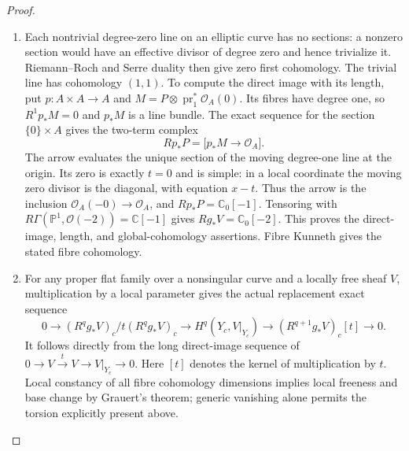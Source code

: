 \begin{proof}

\begin{enumerate}[label={$\langle1\rangle$\arabic*.},leftmargin=*]
\item Each nontrivial degree-zero line on an elliptic curve has no
sections: a nonzero section would have an effective divisor of
degree zero and hence trivialize it. Riemann--Roch and Serre
duality then give zero first cohomology. The trivial line has
cohomology $(1,1)$. To compute the direct image with its length,
put $p:A\times A\to A$ and $M=P\otimes\operatorname{pr}_1^*
\mathcal O_A(0)$. Its fibres have degree one, so
$R^1p_*M=0$ and $p_*M$ is a line bundle. The exact sequence for
the section $\{0\}\times A$ gives the two-term complex
\[
 Rp_*P=\bigl[p_*M\longrightarrow\mathcal O_A\bigr].
\]
The arrow evaluates the unique section of the moving degree-one
line at the origin. Its zero is exactly $t=0$ and is simple:
in a local coordinate the moving zero divisor is the diagonal,
with equation $x-t$. Thus the arrow is the inclusion
$\mathcal O_A(-0)\to\mathcal O_A$, and
$Rp_*P=\mathbb C_0[-1]$. Tensoring with
$R\Gamma(\mathbb P^1,\mathcal O(-2))=\mathbb C[-1]$
gives $Rg_*V=\mathbb C_0[-2]$. This proves the direct-image,
length, and global-cohomology assertions. Fibre Kunneth gives
the stated fibre cohomology.

\item For any proper flat family over a nonsingular curve and a locally
free sheaf $V$, multiplication by a local parameter gives the
actual replacement exact sequence
\[
0\to (R^qg_*V)_c/t(R^qg_*V)_c
 \to H^q(Y_c,V|_{Y_c})
 \to (R^{q+1}g_*V)_c[t]\to0.
\]
It follows directly from the long direct-image sequence of
$0\to V\xrightarrow{t}V\to V|_{Y_c}\to0$. Here $[t]$ denotes
the kernel of multiplication by $t$. Local constancy of all
fibre cohomology dimensions implies local freeness and base
change by Grauert's theorem; generic vanishing alone permits
the torsion explicitly present above.

\end{enumerate}
\end{proof}
